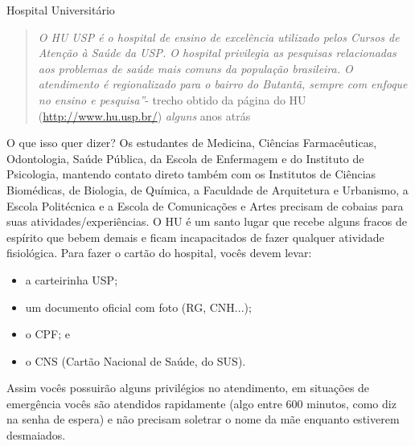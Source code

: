 \begin{secao}{Hospital Universitário}
   \begin{quote}\emph{O HU USP é o hospital de ensino de excelência utilizado
pelos Cursos de Atenção à Saúde da USP.  O hospital privilegia as pesquisas
relacionadas aos problemas de saúde  mais comuns da população brasileira. O
atendimento é regionalizado para o bairro do Butantã, sempre com enfoque no
ensino e pesquisa''}- trecho obtido da página do HU (\url{http://www.hu.usp.br/})
\textit{alguns} anos atrás
   \end{quote}

O que isso quer dizer? Os estudantes de Medicina, Ciências Farmacêuticas,
Odontologia, Saúde Pública, da Escola de Enfermagem e do Instituto de
Psicologia, mantendo contato direto também com os Institutos de Ciências
Biomédicas, de Biologia, de Química, a Faculdade de Arquitetura e Urbanismo,
a Escola Politécnica e a Escola de Comunicações e Artes precisam de cobaias para
suas atividades/experiências. O HU é um santo lugar que recebe alguns fracos
de espírito que bebem demais e ficam incapacitados de fazer qualquer atividade
fisiológica. Para fazer o cartão do hospital, vocês devem levar:

\begin{itemize}
   \item a carteirinha USP;
   \item um documento oficial com foto (RG, CNH...);
   \item o CPF; e
   \item o CNS (Cartão Nacional de Saúde, do SUS).
\end{itemize}

Assim vocês possuirão alguns privilégios no atendimento, em situações de
emergência vocês são atendidos rapidamente (algo entre 600 minutos, como
diz na senha de espera) e não precisam soletrar o nome da mãe enquanto
estiverem desmaiados.

\end{secao}
